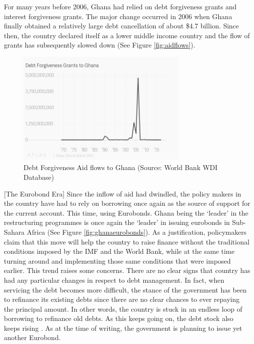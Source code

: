 \documentclass[a4paper, 12pt]{article}
\begin{document}
	For many years before 2006, Ghana had relied on debt forgiveness grants and interest forgiveness grants. The major change occurred in 2006 when Ghana finally obtained a relatively large debt cancellation of about \$4.7 billion. Since then, the country declared itself as a lower middle income country and the flow of grants has subsequently slowed down (See Figure \ref{fig:aidflows}). 
	
	\begin{figure}[h]
		\centering
		\includegraphics*[width=0.75\textwidth]{Data/debt_forgiveness_grants.png}
		\caption[Debt Forgiveness Aid flows to Ghana]{Debt Forgiveness Aid flows to Ghana (Source: World Bank WDI Database)}
		\label{fig:debtforgiveness}
	\end{figure}
	
	
	
	
	[The Eurobond Era]
	Since the inflow of aid had dwindled, the policy makers in the country have had to rely on borrowing once again as the source of support for the current account. This time, using Eurobonds. Ghana being the `leader' in the restructuring programmes is once again the `leader' in issuing eurobonds in Sub-Sahara Africa (See Figure \ref{fig:ghanaeurobonds}). As a justification, policymakers claim that this move will help the country to raise finance without the traditional conditions imposed by the IMF and the World Bank, while at the same time turning around and implementing those same conditions that were imposed earlier.  This trend raises some concerns. There are no clear signs that country has had any particular changes in respect to debt management. In fact, when servicing the debt becomes more difficult, the stance of the government has been to refinance its existing debts since there are no clear chances to ever repaying the principal amount. In other words, the country is stuck in an endless loop of borrowing to refinance old debts. As this keeps going on, the debt stock also keeps rising \cite{Darko2017}. As at the time of writing, the government is planning to issue yet another Eurobond.
	
\end{document}
